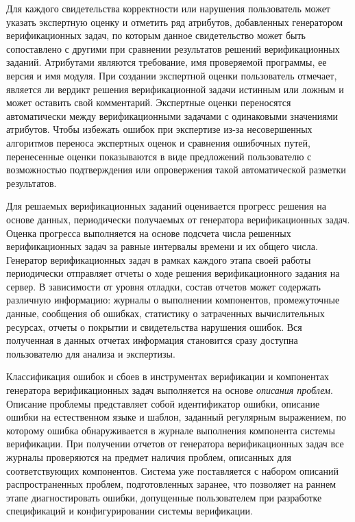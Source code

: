 Для каждого свидетельства корректности или нарушения пользователь может указать экспертную оценку и отметить ряд атрибутов, добавленных генератором верификационных задач, по которым данное свидетельство может быть сопоставлено с другими при сравнении результатов решений верификационных заданий.
Атрибутами являются требование, имя проверяемой программы, ее версия и имя модуля.
При создании экспертной оценки пользователь отмечает, является ли вердикт решения верификационной задачи истинным или ложным и может оставить свой комментарий.
Экспертные оценки переносятся автоматически между верификационными задачами с одинаковыми значениями атрибутов.
Чтобы избежать ошибок при экспертизе из-за несовершенных алгоритмов переноса экспертных оценок и сравнения ошибочных путей, перенесенные оценки показываются в виде предложений пользователю с возможностью подтверждения или опровержения такой автоматической разметки результатов.

Для решаемых верификационных заданий оценивается прогресс решения на основе данных, периодически получаемых от генератора верификационных задач.
Оценка прогресса выполняется на основе подсчета числа решенных верификационных задач за равные интервалы времени и их общего числа.
Генератор верификационных задач в рамках каждого этапа своей работы периодически отправляет отчеты о ходе решения верификационного задания на сервер.
В зависимости от уровня отладки, состав отчетов может содержать различную информацию: журналы о выполнении компонентов, промежуточные данные, сообщения об ошибках, статистику о затраченных вычислительных ресурсах, отчеты о покрытии и свидетельства нарушения ошибок.
Вся полученная в данных отчетах информация становится сразу доступна пользователю для анализа и экспертизы.

Классификация ошибок и сбоев в инструментах верификации и компонентах генератора верификационных задач выполняется на основе \textit{описания проблем}.
Описание проблемы представляет собой идентификатор ошибки, описание ошибки на естественном языке и шаблон, заданный регулярным выражением, по которому ошибка обнаруживается в журнале выполнения компонента системы верификации.
При получении отчетов от генератора верификационных задач все журналы проверяются на предмет наличия проблем, описанных для соответствующих компонентов.
Система уже поставляется с набором описаний распространенных проблем, подготовленных заранее, что позволяет на раннем этапе диагностировать ошибки, допущенные пользователем при разработке спецификаций и конфигурировании системы верификации.

